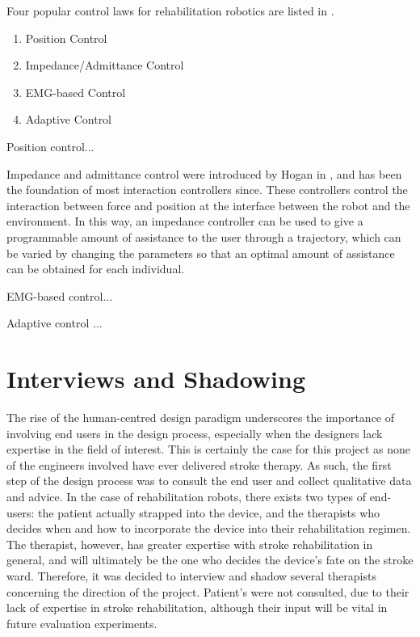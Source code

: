 \documentclass[12pt]{report}
\begin{document}
	Four popular control laws for rehabilitation robotics are listed in \cite{Meng2015}.
	
	\begin{enumerate}
		\item Position Control
		\item Impedance/Admittance Control
		\item EMG-based Control
		\item Adaptive Control 
	\end{enumerate}
	
	Position control...
	
	Impedance and admittance control were introduced by Hogan in \cite{Hogan1985}, and has been the foundation of most interaction controllers since. These controllers control the interaction between force and position at the interface between the robot and the environment. In this way, an impedance controller can be used to give a programmable amount of assistance to the user through a trajectory, which can be varied by changing the parameters so that an optimal amount of assistance can be obtained for each individual. 
	
	EMG-based control...
	
	Adaptive control ...
	
\section{Interviews and Shadowing}

%
	
	The rise of the human-centred design paradigm underscores the importance of involving end users in the design process, especially when the designers lack expertise in the field of interest. This is certainly the case for this project as none of the engineers involved have ever delivered stroke therapy. As such, the first step of the design process was to consult the end user and collect qualitative data and advice. In the case of rehabilitation robots, there exists two types of end-users: the patient actually strapped into the device, and the therapists who decides when and how to incorporate the device into their rehabilitation regimen. The therapist, however, has greater expertise with stroke rehabilitation in general, and will ultimately be the one who decides the device's fate on the stroke ward. Therefore, it was decided to interview and shadow several therapists concerning the direction of the project. Patient's were not consulted, due to their lack of expertise in stroke rehabilitation, although their input will be vital in future evaluation experiments. 
	
\end{document}
